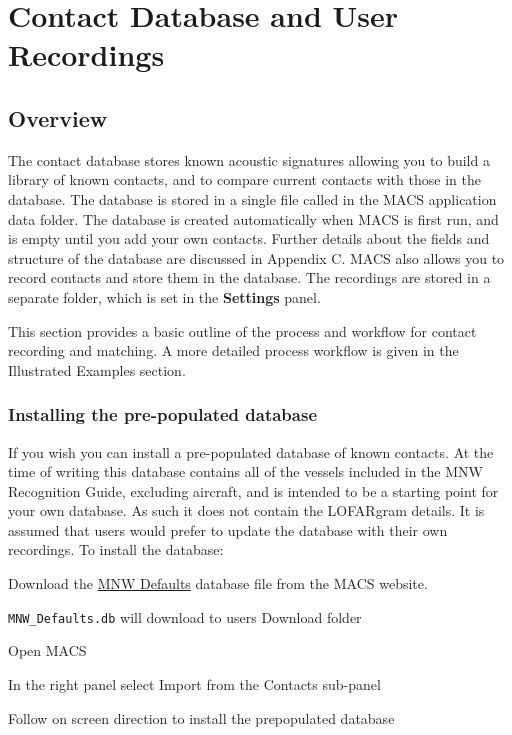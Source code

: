 \section{Contact Database and User Recordings}
\label{sec:Database}
\subsection{Overview}
The contact database stores known acoustic signatures allowing you to build a library of known contacts, and to compare current contacts with those in the database. The database is stored in a single file called  in the MACS application data folder. The database is created automatically when MACS is first run, and is empty until you add your own contacts. Further details about the fields and structure of the database are discussed in Appendix C. MACS also allows you to record contacts and store them in the database. The recordings are stored in a separate folder, which is set in the \textbf{Settings} panel.

\begin{faintquote}
    This section provides a basic outline of the process and workflow for contact recording and matching. A more detailed process workflow is given in the Illustrated Examples section.
\end{faintquote}

\subsubsection{Installing the pre-populated database}
If you wish you can install a pre-populated database of known contacts. At the time of writing this database contains all of the vessels included in the MNW Recognition Guide, excluding aircraft, and is intended to be a starting point for your own database. As such it does not contain the LOFARgram details. It is assumed that users would prefer to update the database with their own recordings. To install the database:

\begin{compactenum}
    \item Download the \href{https://github.com/Mahzel/MACS}{MNW Defaults} database file from the MACS website.
    \item \verb|MNW_Defaults.db| will download to users Download folder
    \item Open MACS
    \item In the right panel select Import from the Contacts sub-panel
    \item Follow on screen direction to install the prepopulated database
\end{compactenum}

